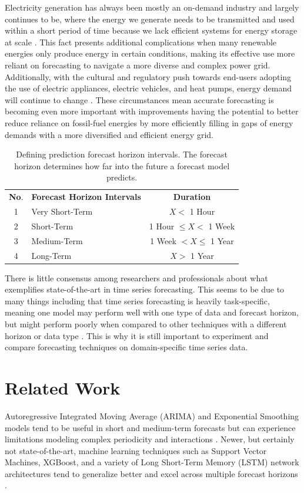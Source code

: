 \documentclass[sigconf]{acmart}
\begin{document}
Electricity generation has always been mostly an on-demand industry and largely continues to be, where the energy we generate needs to be transmitted and used within a short period of time because we lack efficient systems for energy storage at scale \cite{Lai21}. This fact presents additional complications when many renewable energies only produce energy in certain conditions, making its effective use more reliant on forecasting to navigate a more diverse and complex power grid. Additionally, with the cultural and regulatory push towards end-users adopting the use of electric appliances, electric vehicles, and heat pumps, energy demand will continue to change \cite{Archsmith22}. These circumstances mean accurate forecasting is becoming even more important with improvements having the potential to better reduce reliance on fossil-fuel energies by more efficiently filling in gaps of energy demands with a more diversified and efficient energy grid.

\begin{table}
\centering
\caption{Defining prediction forecast horizon intervals. The forecast horizon determines how far into the future a forecast model predicts.}
\begin{tabular}{clc}
\toprule
\hfill \textbf{No}. & \hfil \textbf{Forecast Horizon Intervals} & \textbf{Duration}\\
\cmidrule(lr){1-1}\cmidrule(rl){2-2}\cmidrule(rl){3-3}
  1 & Very Short-Term & $ X < $ 1 Hour \\
  2 & Short-Term  & 1 Hour $ \leq X < $ 1 Week  \\   
  3 & Medium-Term & 1 Week $ < X \leq $ 1 Year  \\   
  4 & Long-Term & $ X > $ 1 Year  \\ 
  \bottomrule
\end{tabular}
\end{table}

There is little consensus among researchers and professionals about what exemplifies state-of-the-art in time series forecasting. This seems to be due to many things including that time series forecasting is heavily task-specific, meaning one model may perform well with one type of data and forecast horizon, but might perform poorly when compared to other techniques with a different horizon or data type \cite{Yue21}. This is why it is still important to experiment and compare forecasting techniques on domain-specific time series data.

\section{Related Work}
Autoregressive Integrated Moving Average (ARIMA) and Exponential Smoothing models tend to be useful in short and medium-term forecasts but can experience limitations modeling complex periodicity and interactions \cite{Muzaffar19, Hopf23}. Newer, but certainly not state-of-the-art, machine learning techniques such as Support Vector Machines, XGBoost, and a variety of Long Short-Term Memory (LSTM) network architectures tend to generalize better and excel across multiple forecast horizons \cite{Sun22, Muzaffar19}.
\end{document}
